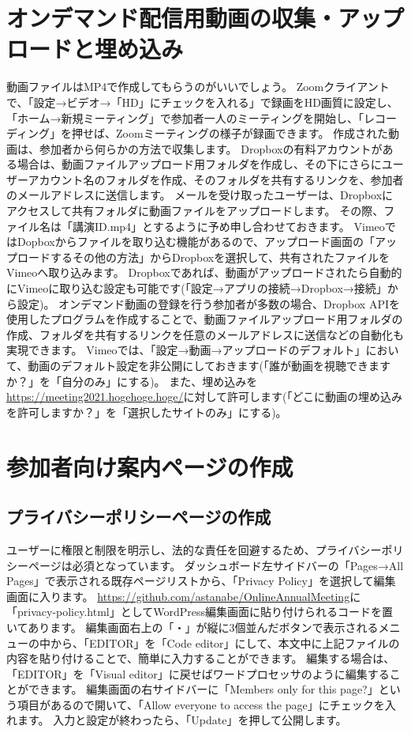 \documentclass[titlepage,10pt,a4paper,uplatex]{jsbook}
\begin{document}
\section{オンデマンド配信用動画の収集・アップロードと埋め込み}

動画ファイルはMP4で作成してもらうのがいいでしょう。
Zoomクライアントで、「設定→ビデオ→「HD」にチェックを入れる」で録画をHD画質に設定し、「ホーム→新規ミーティング」で参加者一人のミーティングを開始し、「レコーディング」を押せば、Zoomミーティングの様子が録画できます。
作成された動画は、参加者から何らかの方法で収集します。
Dropboxの有料アカウントがある場合は、動画ファイルアップロード用フォルダを作成し、その下にさらにユーザーアカウント名のフォルダを作成、そのフォルダを共有するリンクを、参加者のメールアドレスに送信します。
メールを受け取ったユーザーは、Dropboxにアクセスして共有フォルダに動画ファイルをアップロードします。
その際、ファイル名は「講演ID.mp4」とするように予め申し合わせておきます。
VimeoではDopboxからファイルを取り込む機能があるので、アップロード画面の「アップロードするその他の方法」からDropboxを選択して、共有されたファイルをVimeoへ取り込みます。
Dropboxであれば、動画がアップロードされたら自動的にVimeoに取り込む設定も可能です(「設定→アプリの接続→Dropbox→接続」から設定)。
オンデマンド動画の登録を行う参加者が多数の場合、Dropbox APIを使用したプログラムを作成することで、動画ファイルアップロード用フォルダの作成、フォルダを共有するリンクを任意のメールアドレスに送信などの自動化も実現できます。
Vimeoでは、「設定→動画→アップロードのデフォルト」において、動画のデフォルト設定を非公開にしておきます(「誰が動画を視聴できますか？」を「自分のみ」にする)。
また、埋め込みを\url{https://meeting2021.hogehoge.hoge/}に対して許可します(「どこに動画の埋め込みを許可しますか？」を「選択したサイトのみ」にする)。

\section{参加者向け案内ページの作成}

\subsection{プライバシーポリシーページの作成}

ユーザーに権限と制限を明示し、法的な責任を回避するため、プライバシーポリシーページは必須となっています。
ダッシュボード左サイドバーの「Pages→All Pages」で表示される既存ページリストから、「Privacy Policy」を選択して編集画面に入ります。
\url{https://github.com/astanabe/OnlineAnnualMeeting}に「privacy-policy.html」としてWordPress編集画面に貼り付けられるコードを置いてあります。
編集画面右上の「・」が縦に3個並んだボタンで表示されるメニューの中から、「EDITOR」を「Code editor」にして、本文中に上記ファイルの内容を貼り付けることで、簡単に入力することができます。
編集する場合は、「EDITOR」を「Visual editor」に戻せばワードプロセッサのように編集することができます。
編集画面の右サイドバーに「Members only for this page?」という項目があるので開いて、「Allow everyone to access the page」にチェックを入れます。
入力と設定が終わったら、「Update」を押して公開します。
\end{document}
